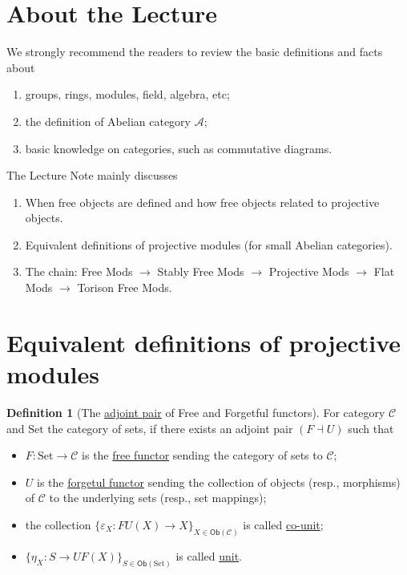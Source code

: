 \documentclass{MainStyle}
\theoremstyle{definition}
\theoremstyle{definition}
\theoremstyle{definition}
\newtheorem{definition}{Definition}
\theoremstyle{definition}
\theoremstyle{definition}
\theoremstyle{definition}
\theoremstyle{remark}
\theoremstyle{remark}
\begin{document}
\maketitle
\section{About the Lecture}
We strongly recommend the readers to review the basic definitions and facts about
\begin{enumerate}
    \item groups, rings, modules, field, algebra, etc;
    \item the definition of Abelian category $\mathcal A$;
    \item basic knowledge on categories, such as commutative diagrams.
\end{enumerate}
The Lecture Note mainly discusses
\begin{enumerate}
    \item When free objects are defined and how free objects related to projective objects.
    \item Equivalent definitions of projective modules (for small Abelian categories).
    \item The chain: Free Mods $\to$ Stably Free Mods $\to$ Projective Mods $\to$ Flat Mods $\to$ Torison Free Mods.
\end{enumerate}

\section{Equivalent definitions of projective modules}

\begin{definition}[The \href{https://ncatlab.org/nlab/show/adjoint+functor}{adjoint pair} of Free and Forgetful functors]
    For category $\mathcal C$ and $\mathrm{Set}$ the category of sets, if there exists an adjoint pair $(F\dashv U)$ such that
    \begin{itemize}
        \item $F:\mathrm{Set}\to \mathcal C$ is the \href{https://ncatlab.org/nlab/show/free+functor}{free functor} sending the category of sets to $\mathcal C$;
        \item $U$ is the \href{https://ncatlab.org/nlab/show/forgetful+functor}{forgetul functor} sending the collection of objects (resp., morphisms) of $\mathcal C$ to the underlying sets (resp., set mappings);
        \item the collection $\{\varepsilon_X:FU(X)\to X\}_{X\in \mathsf{Ob}(\mathcal C)}$ is called \href{https://ncatlab.org/nlab/show/unit+of+an+adjunction}{co-unit};
        \item $\{\eta_X:S\to UF(X)\}_{S\in\mathsf{Ob}(\mathrm{Set})}$ is called \href{https://ncatlab.org/nlab/show/unit+of+an+adjunction}{unit}.
    \end{itemize}
\end{definition}
\end{document}
